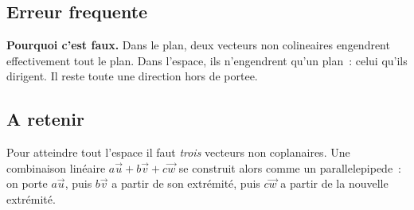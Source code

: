 

\subsection*{Erreur frequente}


\textbf{Pourquoi c'est faux.} Dans le plan, deux vecteurs non colineaires
engendrent effectivement tout le plan. Dans l'espace, ils n'engendrent qu'un
plan~: celui qu'ils dirigent. Il reste toute une direction hors de portee.


\subsection*{A retenir}

Pour atteindre tout l'espace il faut \emph{trois} vecteurs non coplanaires.
Une combinaison linéaire $a\vec{u}+b\vec{v}+c\vec{w}$ se construit alors comme
un parallelepipede~: on porte $a\vec{u}$, puis $b\vec{v}$ a partir de son
extrémité, puis $c\vec{w}$ a partir de la nouvelle extrémité.

